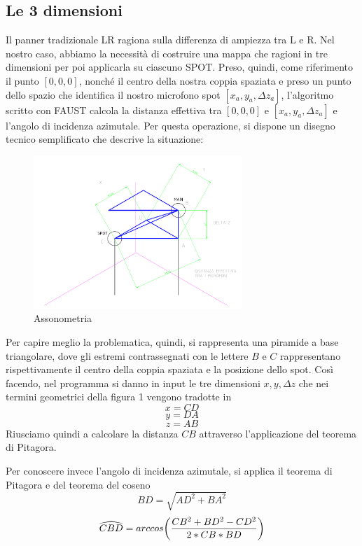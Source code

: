 \documentclass{article}
\begin{document}
    \subsection{Le 3 dimensioni}
    Il panner tradizionale LR ragiona sulla differenza di ampiezza tra L e R. Nel nostro caso, abbiamo la necessità di costruire una mappa che ragioni in tre dimensioni per poi applicarla su ciascuno SPOT. Preso, quindi, come riferimento il punto $\left[0,0,0\right]$, nonché il centro della nostra coppia spaziata e preso un punto dello spazio che identifica il nostro microfono spot $\left[x_a,y_a,\Delta z_a\right]$, l'algoritmo scritto con FAUST calcola
    la distanza effettiva tra $\left[0,0,0\right]$ e $\left[x_a,y_a,\Delta z_a\right]$ e l'angolo di incidenza azimutale. Per questa operazione, si dispone un disegno tecnico semplificato che descrive la situazione:

    \begin{figure}[H]
        \centering
        \includegraphics[width=0.7\textwidth]{images/Assonometria.png}
         \caption{\label{fig1}Assonometria}
    \end{figure}

    Per capire meglio la problematica, quindi, si rappresenta una piramide a base triangolare, dove gli estremi contrassegnati con le lettere $B$ e $C$ rappresentano rispettivamente il centro della coppia spaziata e la posizione dello spot. Così facendo, nel programma si danno in input le tre dimensioni $x, y, \Delta z$ che nei termini geometrici della figura 1 vengono tradotte in
    $$x = CD$$
    $$y = DA$$
    $$z = AB$$
    Riusciamo quindi a calcolare la distanza $CB$ attraverso l'applicazione del teorema di Pitagora.

    Per conoscere invece l'angolo di incidenza azimutale, si applica il teorema di Pitagora e del teorema del coseno
    $$BD = \sqrt{AD^2 + BA ^ 2}$$
    $$\widehat{CBD} = arccos \biggl( {CB ^ 2 + BD ^ 2 - CD ^ 2\over 2 * CB * BD} \biggr)$$
\end{document}
